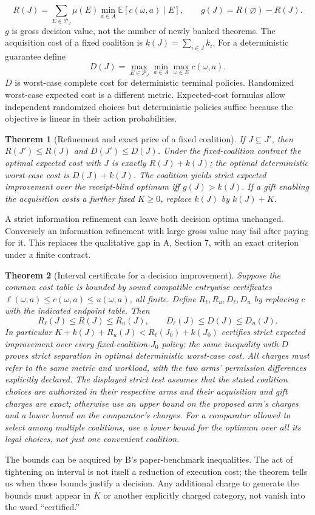 \documentclass[11pt,letterpaper]{article}
\newtheorem{theorem}{Theorem}[section]\newtheorem{proposition}[theorem]{Proposition}\newtheorem{corollary}[theorem]{Corollary}\newtheorem{definition}[theorem]{Definition}
\newcommand{\E}{\mathbb E}\newcommand{\R}{\mathbb R}\newcommand{\N}{\mathbb N}\newcommand{\ind}{\mathbf 1}
\begin{document}
\[
 R(J)=\sum_{E\in\mathcal P_J}\mu(E)\min_{a\in A}\E[c(\omega,a)\mid E],\qquad
 g(J)=R(\varnothing)-R(J).
\]
$g$ is gross decision value, not the number of newly banked theorems. The acquisition cost of a fixed coalition is $k(J)=\sum_{i\in J}k_i$. For a deterministic guarantee define
\[
 D(J)=\max_{E\in\mathcal P_J}\min_{a\in A}\max_{\omega\in E}c(\omega,a).
\]
$D$ is worst-case complete cost for deterministic terminal policies. Randomized worst-case expected cost is a different metric. Expected-cost formulas allow independent randomized choices but deterministic policies suffice because the objective is linear in their action probabilities.

\begin{theorem}[Refinement and exact price of a fixed coalition]\label{thm:partition}
If $J\subseteq J'$, then $R(J')\le R(J)$ and $D(J')\le D(J)$. Under the fixed-coalition contract the optimal expected cost with $J$ is exactly $R(J)+k(J)$; the optimal deterministic worst-case cost is $D(J)+k(J)$. The coalition yields strict expected improvement over the receipt-blind optimum iff $g(J)>k(J)$. If a gift enabling the acquisition costs a further fixed $K\ge0$, replace $k(J)$ by $k(J)+K$.
\end{theorem}
A strict information refinement can leave both decision optima unchanged. Conversely an information refinement with large gross value may fail after paying for it. This replaces the qualitative gap in A, Section 7, with an exact criterion under a finite contract.

\begin{theorem}[Interval certificate for a decision improvement]\label{thm:interval}
Suppose the common cost table is bounded by sound compatible entrywise certificates $\ell(\omega,a)\le c(\omega,a)\le u(\omega,a)$, all finite. Define $R_\ell,R_u,D_\ell,D_u$ by replacing $c$ with the indicated endpoint table. Then
\[
 R_\ell(J)\le R(J)\le R_u(J),\qquad D_\ell(J)\le D(J)\le D_u(J).
\]
In particular $K+k(J)+R_u(J)<R_\ell(J_0)+k(J_0)$ certifies strict expected improvement over \emph{every} fixed-coalition-$J_0$ policy; the same inequality with $D$ proves strict separation in optimal deterministic worst-case cost. All charges must refer to the same metric and workload, with the two arms' permission differences explicitly declared. The displayed strict test assumes that the stated coalition choices are authorized in their respective arms and their acquisition and gift charges are exact; otherwise use an upper bound on the proposed arm's charges and a lower bound on the comparator's charges. For a comparator allowed to select among multiple coalitions, use a lower bound for the optimum over all its legal choices, not just one convenient coalition.
\end{theorem}
The bounds can be acquired by B's paper-benchmark inequalities. The act of tightening an interval is not itself a reduction of execution cost; the theorem tells us when those bounds justify a decision. Any additional charge to generate the bounds must appear in $K$ or another explicitly charged category, not vanish into the word ``certified.''
\end{document}
